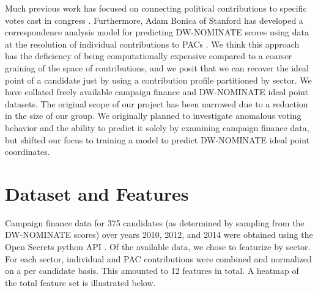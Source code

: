 \documentclass[12]{article}
\begin{document}
\noindent Much previous work has focused on connecting political contributions to specific votes cast in congress \cite{stratmann1991campaign,stratmann1995campaign}. Furthermore, Adam Bonica of Stanford has developed a correspondence analysis model for predicting DW-NOMINATE scores using data at the resolution of individual contributions to PACs \cite{bonica2013ideology}. We think this approach has the deficiency of being computationally expensive compared to a coarser graining of the space of contributions, and we posit that we can recover the ideal point of a candidate just by using a contribution profile partitioned by sector. We have collated freely available campaign finance \cite{open_secrets} and DW-NOMINATE ideal point \cite{DWWEB} datasets. The original scope of our project has been narrowed due to a reduction in the size of our group. We originally planned to investigate anomalous voting behavior and the ability to predict it solely by examining campaign finance data, but shifted our focus to training a model to predict DW-NOMINATE ideal point coordinates.\\

\section*{Dataset and Features}

\noindent Campaign finance data for 375 candidates (as determined by sampling from
the DW-NOMINATE scores) over years 2010, 2012, and 2014 were obtained using the 
Open Secrets python API \cite{open_secrets}. Of the available data, we chose to 
featurize by sector. For each sector, individual and PAC contributions were 
combined and normalized on a per candidate basis. This amounted to 12 features in total. A heatmap of the total feature 
set is illustrated below.\\ 
\end{document}
